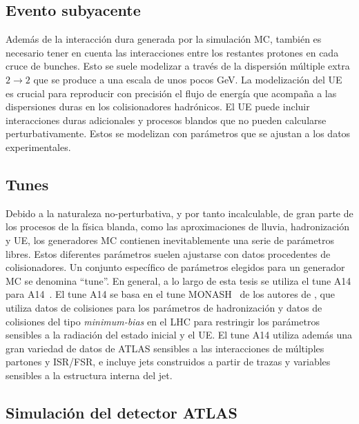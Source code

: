 \subsection{Evento subyacente}

Además de la interacción dura generada por la simulación \ac{MC}, también es necesario tener en cuenta las interacciones entre los restantes protones en cada cruce de bunches. Esto se suele modelizar a través de la dispersión múltiple extra \(2 \to 2\) que se produce a una escala de unos pocos GeV. La modelización del \ac{UE} es crucial para reproducir con precisión el flujo de energía que acompaña a las dispersiones duras en los colisionadores hadrónicos. El \ac{UE} puede incluir interacciones duras adicionales y procesos blandos que no pueden calcularse perturbativamente. Estos se modelizan con parámetros que se ajustan a los datos experimentales.



\subsection{Tunes}

Debido a la naturaleza no-perturbativa, y por tanto incalculable, de gran parte de los procesos de la física blanda, como las aproximaciones de lluvia, hadronización y \ac{UE}, los generadores \ac{MC} contienen inevitablemente una serie de parámetros libres. Estos diferentes parámetros suelen ajustarse con datos procedentes de colisionadores. Un conjunto específico de parámetros elegidos para un generador \ac{MC} se denomina \enquote{tune}.
En general, a lo largo de esta tesis se utiliza el tune A14 para \Pythia A14~\cite{Pythia-A14Tune}.
El tune A14 se basa en el tune MONASH~\cite{MonashTune} de los autores de \Pythia, que utiliza datos de colisiones \ee para los parámetros de hadronización y datos de colisiones \pp del tipo \textit{minimum-bias} en el \ac{LHC} para restringir los parámetros sensibles a la radiación del estado inicial y el \ac{UE}. El tune A14 utiliza además una gran variedad de datos de \ac{ATLAS} sensibles a las interacciones de múltiples partones y \ac{ISR}/\ac{FSR}, e incluye jets construidos a partir de trazas y variables sensibles a la estructura interna del jet.


\subsection{Simulación del detector \acs{ATLAS}}

